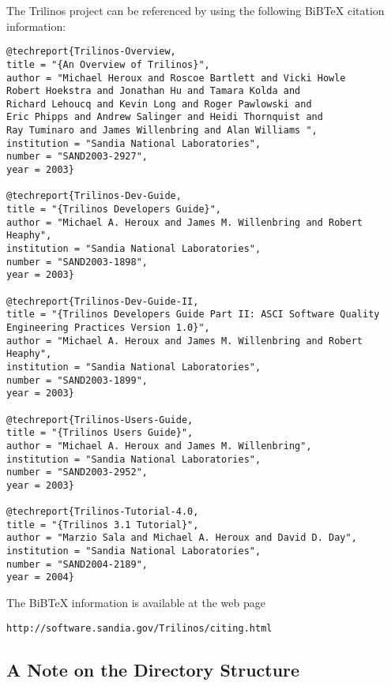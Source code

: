 The Trilinos project can be referenced by using the following BiBTeX
citation information:
\begin{verbatim}
@techreport{Trilinos-Overview,
title = "{An Overview of Trilinos}",
author = "Michael Heroux and Roscoe Bartlett and Vicki Howle
Robert Hoekstra and Jonathan Hu and Tamara Kolda and
Richard Lehoucq and Kevin Long and Roger Pawlowski and
Eric Phipps and Andrew Salinger and Heidi Thornquist and
Ray Tuminaro and James Willenbring and Alan Williams ",
institution = "Sandia National Laboratories",
number = "SAND2003-2927",
year = 2003}

@techreport{Trilinos-Dev-Guide,
title = "{Trilinos Developers Guide}",
author = "Michael A. Heroux and James M. Willenbring and Robert Heaphy",
institution = "Sandia National Laboratories",
number = "SAND2003-1898",
year = 2003}

@techreport{Trilinos-Dev-Guide-II,
title = "{Trilinos Developers Guide Part II: ASCI Software Quality
Engineering Practices Version 1.0}",
author = "Michael A. Heroux and James M. Willenbring and Robert Heaphy",
institution = "Sandia National Laboratories",
number = "SAND2003-1899",
year = 2003}

@techreport{Trilinos-Users-Guide,
title = "{Trilinos Users Guide}",
author = "Michael A. Heroux and James M. Willenbring",
institution = "Sandia National Laboratories",
number = "SAND2003-2952",
year = 2003}

@techreport{Trilinos-Tutorial-4.0,
title = "{Trilinos 3.1 Tutorial}",
author = "Marzio Sala and Michael A. Heroux and David D. Day",
institution = "Sandia National Laboratories",
number = "SAND2004-2189",
year = 2004}
\end{verbatim}
The BiBTeX information is available at the web page
\begin{verbatim}
http://software.sandia.gov/Trilinos/citing.html
\end{verbatim}


\subsection{A Note on the Directory Structure}
\label{sec:into_note}

